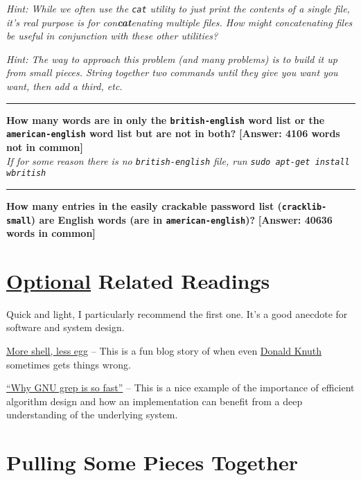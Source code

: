 \documentclass{article}
\begin{document}
\medskip
\noindent
\emph{\small Hint: While we often use the \texttt{cat} utility to just print
  the contents of a single file, it's real purpose is for con\textbf{cat}enating
  multiple files. How might concatenating files be useful in conjunction with
  these other utilities?
}

\medskip
\noindent
\emph{\small Hint: The way to approach this problem (and many problems) is to
  build it up from small pieces. String together two commands until they give
  you want you want, then add a third, etc.
}


\bigskip
\hrule
\smallskip
\noindent
\textbf{How many words are in only the \texttt{british-english} word list or
the \texttt{american-english} word list but are not in both?}
\hfill \textbf{[Answer: 4106 words not in common]}\\
\emph{\small If for some reason there is no \texttt{british-english} file, run
\texttt{sudo apt-get install wbritish}}
\vspace{3cm}

\hrule
\smallskip
\noindent
\textbf{How many entries in the easily crackable password list
  (\texttt{cracklib-small}) are English words (are in
\texttt{american-english})?}
\hfill \textbf{[Answer: 40636 words in common]}
\vspace{3cm}

\vfill
\section*{\ul{Optional} Related Readings}
Quick and light, I particularly recommend the first one. It's a good anecdote
for software and system design.

\medskip
\noindent
\href{http://www.leancrew.com/all-this/2011/12/more-shell-less-egg/}{More
shell, less egg} -- This is a fun blog story of when even
\href{https://en.wikipedia.org/wiki/Donald_Knuth}{Donald Knuth} sometimes gets
things wrong.

\medskip
\noindent
\href{https://lists.freebsd.org/pipermail/freebsd-current/2010-August/019310.html}{``Why GNU grep is so fast''} --
This is a nice example of the importance of efficient algorithm design and how
an implementation can benefit from a deep understanding of the underlying
system.




\newpage

\section{Pulling Some Pieces Together}
\end{document}
